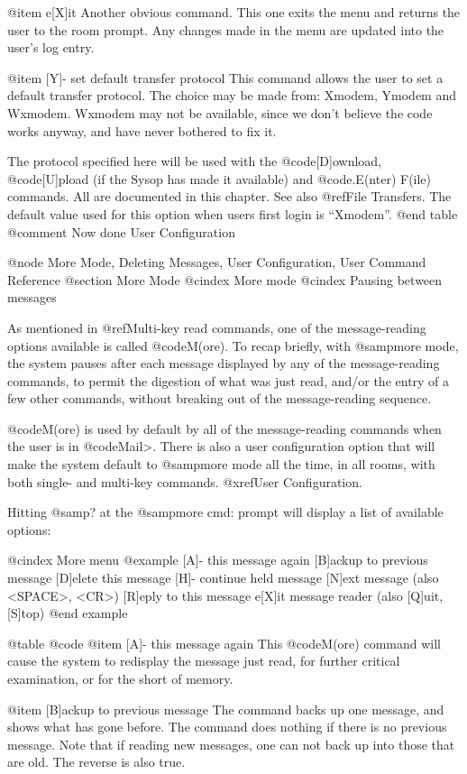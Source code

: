 @item e[X]it
Another obvious command.  This one exits the menu and
returns the user to the room prompt.  Any changes made in the
menu are updated into the user's log entry.

@item [Y]- set default transfer protocol
This command allows the user to set a default transfer
protocol.  The choice may be made from:  Xmodem, Ymodem and
Wxmodem.  Wxmodem may not be available, since we don't believe
the code works anyway, and have never bothered to fix it.

The protocol specified here will be used with the
@code{[D]ownload}, @code{[U]pload} (if the Sysop has made it available) and
@code{.E(nter) F(ile)} commands.  All are documented in this chapter.
See also @ref{File Transfers}.
The default value used for this option when users first login is ``Xmodem''.
@end table
@comment Now done User Configuration

@node More Mode, Deleting Messages, User Configuration, User Command Reference
@section More Mode
@cindex More mode
@cindex Pausing between messages

As mentioned in @ref{Multi-key read commands}, one of the message-reading
options available is called @code{M(ore)}.  To recap briefly, with
@samp{more} mode, the system pauses after each message displayed by any
of the message-reading commands, to permit the digestion of what was just
read, and/or the entry of a few other commands, without breaking out of
the message-reading sequence.

@code{M(ore)} is used by default by all of the message-reading commands
when the user is in @code{Mail>}.  There is also a user configuration
option that will make the system default to @samp{more} mode all the time, in
all rooms, with both single- and multi-key commands.  @xref{User Configuration}.

Hitting @samp{?} at the @samp{more cmd:} prompt will display a list of
available options:

@cindex More menu
@example
[A]- this message again
[B]ackup to previous message
[D]elete this message
[H]- continue held message
[N]ext message (also <SPACE>, <CR>)
[R]eply to this message
e[X]it message reader (also [Q]uit, [S]top)
@end example

@table @code
@item [A]- this message again
This @code{M(ore)} command will cause the system to
redisplay the message just read, for further critical
examination, or for the short of memory.

@item [B]ackup to previous message
The command backs up one message, and shows
what has gone before.  The command does nothing if
there is no previous message.  Note that if reading
new messages, one can not back up into those that are
old.  The reverse is also true.

